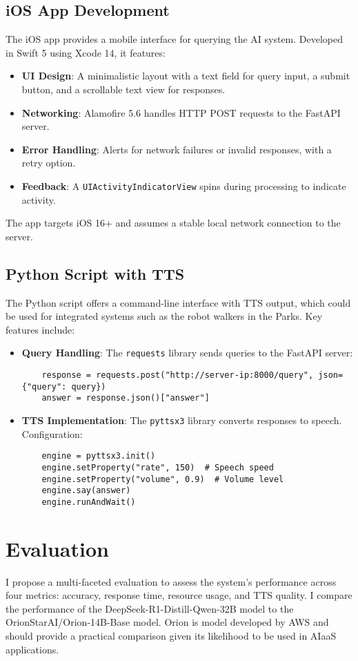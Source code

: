 \documentclass[11pt]{article}
\begin{document}
\subsection{iOS App Development}
The iOS app provides a mobile interface for querying the AI system. Developed in Swift 5 using Xcode 14, it features:
\begin{itemize}
    \item \textbf{UI Design}: A minimalistic layout with a text field for query input, a submit button, and a scrollable text view for responses.
    \item \textbf{Networking}: Alamofire 5.6 handles HTTP POST requests to the FastAPI server.
    \item \textbf{Error Handling}: Alerts for network failures or invalid responses, with a retry option.
    \item \textbf{Feedback}: A \texttt{UIActivityIndicatorView} spins during processing to indicate activity.
\end{itemize}
The app targets iOS 16+ and assumes a stable local network connection to the server.

\subsection{Python Script with TTS}
The Python script offers a command-line interface with TTS output, which could be used for integrated systems such as the robot walkers in the Parks. Key features include:
\begin{itemize}
    \item \textbf{Query Handling}: The \texttt{requests} library sends queries to the FastAPI server:
    \begin{verbatim}
    response = requests.post("http://server-ip:8000/query", json={"query": query})
    answer = response.json()["answer"]
    \end{verbatim}
    \item \textbf{TTS Implementation}: The \texttt{pyttsx3} library converts responses to speech. Configuration:
    \begin{verbatim}
    engine = pyttsx3.init()
    engine.setProperty("rate", 150)  # Speech speed
    engine.setProperty("volume", 0.9)  # Volume level
    engine.say(answer)
    engine.runAndWait()
    \end{verbatim}
\end{itemize}

\section{Evaluation}
\label{sec:evaluation}
I propose a multi-faceted evaluation to assess the system’s performance across four metrics: accuracy, response time, resource usage, and TTS quality. I compare the performance of the DeepSeek-R1-Distill-Qwen-32B model to the OrionStarAI/Orion-14B-Base model. Orion is model developed by AWS and should provide a practical comparison given its likelihood to be used in AIaaS applications.
\end{document}
